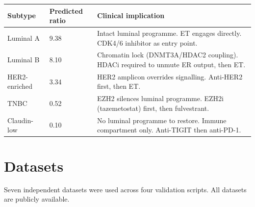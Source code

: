 \documentclass[12pt, a4paper]{article}
\begin{document}
\begin{center}
\begin{tabular}{llp{7cm}}
\toprule
\textbf{Subtype} & \textbf{Predicted ratio}
& \textbf{Clinical implication} \\
\midrule
Luminal A     & 9.38
& Intact luminal programme. ET engages directly.
  CDK4/6 inhibitor as entry point. \\
Luminal B     & 8.10
& Chromatin lock (DNMT3A/HDAC2 coupling).
  HDACi required to unmute ER output, then ET. \\
HER2-enriched & 3.34
& HER2 amplicon overrides signalling.
  Anti-HER2 first, then ET. \\
TNBC          & 0.52
& EZH2 silences luminal programme.
  EZH2i (tazemetostat) first, then fulvestrant. \\
Claudin-low   & 0.10
& No luminal programme to restore.
  Immune compartment only. Anti-TIGIT then anti-PD-1. \\
\bottomrule
\end{tabular}
\end{center}

\section{Datasets}

Seven independent datasets were used across four validation
scripts. All datasets are publicly available.
\end{document}
